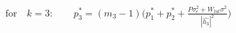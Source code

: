 \documentclass[preview]{standalone}
\begin{document}
\begin{align*}
\text{for} \quad k=3: \qquad p_3^\ast = \left(m_3 - 1\right) \Bigg( p_1^\ast + p_2^\ast + \frac{P \sigma_\epsilon^2 + W_{tot} \sigma^2}{\left|\hat{h_3}\right|^2} \Bigg)
\end{align*}
\end{document}
